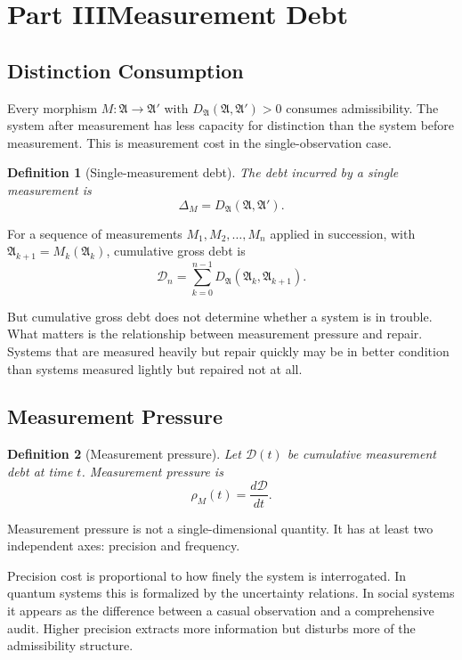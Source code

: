 \documentclass[12pt, a4paper]{article}
\theoremstyle{flyxion}
\newtheorem{definition}{Definition}
\newcommand{\fA}{\mathfrak{A}}
\newcommand{\cD}{\mathcal{D}}
\newcommand{\DA}{D_{\fA}}
\newcommand{\rhoM}{\rho_{M}}
\begin{document}
\section*{Part III\quad Measurement Debt}

\subsection*{Distinction Consumption}

Every morphism $M: \fA \to \fA'$ with $\DA(\fA,\fA') > 0$ consumes admissibility. The system after measurement has less capacity for distinction than the system before measurement. This is measurement cost in the single-observation case.

\begin{definition}[Single-measurement debt]
The debt incurred by a single measurement is
\[
  \Delta_M = \DA(\fA,\fA').
\]
\end{definition}

For a sequence of measurements $M_1, M_2, \ldots, M_n$ applied in succession, with $\fA_{k+1} = M_k(\fA_k)$, cumulative gross debt is
\[
  \cD_n = \sum_{k=0}^{n-1} \DA(\fA_k, \fA_{k+1}).
\]

But cumulative gross debt does not determine whether a system is in trouble. What matters is the relationship between measurement pressure and repair. Systems that are measured heavily but repair quickly may be in better condition than systems measured lightly but repaired not at all.

\subsection*{Measurement Pressure}

\begin{definition}[Measurement pressure]
Let $\cD(t)$ be cumulative measurement debt at time $t$. Measurement pressure is
\[
  \rhoM(t) = \frac{d\cD}{dt}.
\]
\end{definition}

Measurement pressure is not a single-dimensional quantity. It has at least two independent axes: precision and frequency.

Precision cost is proportional to how finely the system is interrogated. In quantum systems this is formalized by the uncertainty relations. In social systems it appears as the difference between a casual observation and a comprehensive audit. Higher precision extracts more information but disturbs more of the admissibility structure.
\end{document}
